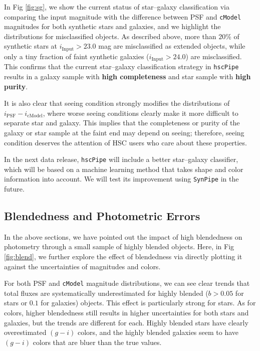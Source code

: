 \documentclass[useamsfonts]{pasj01}
\def\hscpipe{\texttt{hscPipe}}
\def\synpipe{\texttt{SynPipe}}
\def\cmodel{\texttt{cModel}}
\begin{document}
    In Fig \ref{fig:sg}, we show the current status of star--galaxy classification
    via comparing the input magnitude with the difference between PSF and \cmodel{}
    magnitudes for both synthetic stars and galaxies, and we highlight the distributions
    for misclassified objects.
    As described above, more than $20$\% of synthetic stars at
    $i_{\mathrm{Input}}>23.0$ mag are misclassified as extended objects, while only a
    tiny fraction of faint synthetic galaxies ($i_{\mathrm{Input}}>24.0$) are
    misclassified.
    This confirms that the current star--galaxy classification strategy in \hscpipe{}
    results in a galaxy sample with \textbf{high completeness} and star sample
    with \textbf{high purity}.

    It is also clear that seeing condition strongly modifies the distributions
    of $i_{\mathrm{PSF}}-i_{\mathrm{cModel}}$, where worse seeing conditions clearly make it
    more difficult to separate star and galaxy.
    This implies that the completeness or purity of the galaxy or star sample at the faint end may depend on seeing; therefore, seeing condition deserves the attention of HSC users who care about these properties.

    In the next data release, \hscpipe{} will include a better star--galaxy classifier, which will be based on a machine learning method that takes shape and color information into account. We will test its improvement using \synpipe{} in the future.

\subsection{Blendedness and Photometric Errors}
    \label{ssec:blendedness}

    In the above sections, we have pointed out the impact of high blendedness on
    photometry through a small sample of highly blended objects.
    Here, in Fig \ref{fig:blend}, we further explore the effect of blendedness via
    directly plotting it against the uncertainties of magnitudes and colors.

    For both PSF and \cmodel{} magnitude distributions, we can see clear trends that total fluxes are systematically underestimated for highly blended
    ($b>0.05$ for stars or $0.1$ for galaxies) objects.
    This effect is particularly strong for stars.
    As for colors, higher blendedness still results in higher uncertainties for both
    stars and galaxies, but the trends are different for each.
    Highly blended stars have clearly overestimated $(g-i)$ colors, and the
    highly blended galaxies seem to have  $(g-i)$ colors that are bluer than the true values.
\end{document}
